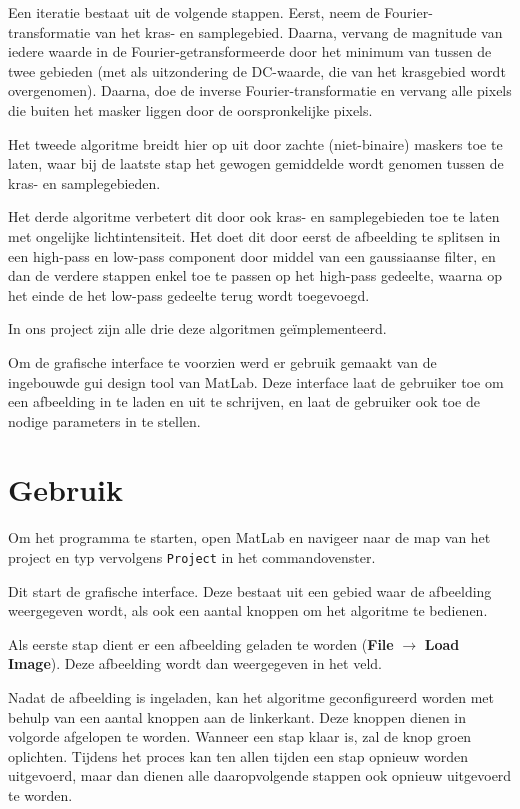 \documentclass[a4paper,14pt]{extarticle}
\begin{document}
Een iteratie bestaat uit de volgende stappen. Eerst, neem de
Fourier-transformatie van het kras- en samplegebied. Daarna, vervang de
magnitude van iedere waarde in de Fourier-getransformeerde door het minimum van
tussen de twee gebieden (met als uitzondering de DC-waarde, die van het
krasgebied wordt overgenomen). Daarna, doe de inverse Fourier-transformatie en
vervang alle pixels die buiten het masker liggen door de oorspronkelijke pixels.

Het tweede algoritme breidt hier op uit door zachte (niet-binaire) maskers toe
te laten, waar bij de laatste stap het gewogen gemiddelde wordt genomen tussen
de kras- en samplegebieden.

Het derde algoritme verbetert dit door ook kras- en samplegebieden toe te laten
met ongelijke lichtintensiteit. Het doet dit door eerst de afbeelding te
splitsen in een high-pass en low-pass component door middel van een gaussiaanse
filter, en dan de verdere stappen enkel toe te passen op het high-pass
gedeelte, waarna op het einde de het low-pass gedeelte terug wordt toegevoegd.

In ons project zijn alle drie deze algoritmen ge\"implementeerd.

Om de grafische interface te voorzien werd er gebruik gemaakt van de ingebouwde
gui design tool van MatLab. Deze interface laat de gebruiker toe om een
afbeelding in te laden en uit te schrijven, en laat de gebruiker ook toe de
nodige parameters in te stellen.

\section{Gebruik}

Om het programma te starten, open MatLab en navigeer naar de map van het
project en typ vervolgens \texttt{Project} in het commandovenster.

Dit start de grafische interface. Deze bestaat uit een gebied waar de
afbeelding weergegeven wordt, als ook een aantal knoppen om het algoritme te
bedienen.

Als eerste stap dient er een afbeelding geladen te worden 
(\textbf{File} $\to$ \textbf{Load Image}). Deze afbeelding wordt dan
weergegeven in het veld.

Nadat de afbeelding is ingeladen, kan het algoritme geconfigureerd worden met
behulp van een aantal knoppen aan de linkerkant. Deze knoppen dienen in
volgorde afgelopen te worden. Wanneer een stap klaar is, zal de knop groen
oplichten. Tijdens het proces kan ten allen tijden een stap opnieuw worden
uitgevoerd, maar dan dienen alle daaropvolgende stappen ook opnieuw uitgevoerd
te worden.
\end{document}
